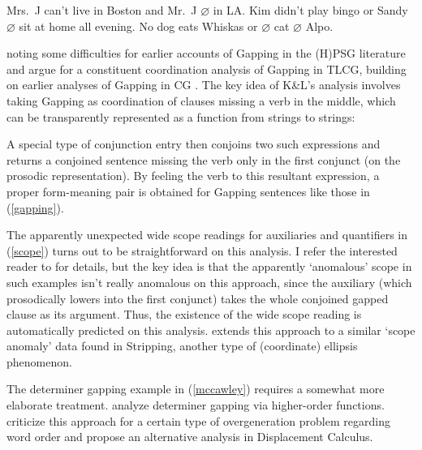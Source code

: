 \documentclass[output=paper]{langsci/langscibook}
\begin{document}
\begin{exe}
 \ex\label{scope}
  \begin{xlist}
 \ex\label{mrj1}
    Mrs.\ J can't live in Boston and Mr.\ J  \ensuremath{\varnothing}  in LA.
 \ex\label{ex2b}
    Kim didn't play bingo or Sandy  \ensuremath{\varnothing}  sit at home all evening.
 \ex\label{mccawley}
    No dog eats Whiskas or  \ensuremath{\varnothing}  cat  \ensuremath{\varnothing}  Alpo.
  \end{xlist}
\end{exe}

\citet{kubota-levine-nels,kubota-levine-gapping} noting some difficulties
for earlier accounts of Gapping in the (H)PSG literature and argue
for a constituent coordination analysis of Gapping in TLCG, building
on earlier analyses of Gapping in CG 
\citep{Steedman90a-u,hendriks95,morrillsolias93}. The key idea of
K\&L's analysis involves taking Gapping as coordination of clauses
missing a verb in the middle, which can be transparently represented
as a function from strings to strings:

\begin{exe}
 \ex\label{}
  \pt{ \ensuremath{\lambda} \ensuremath{\greekp}. leslie \ensuremath{\circ}\xspace \ensuremath{\greekp} \ensuremath{\circ}\xspace a \ensuremath{\circ}\xspace cd }
\end{exe}
A special type of conjunction entry then conjoins two such expressions
and returns a conjoined sentence missing the verb only in the first
conjunct (on the prosodic representation). By feeling the verb to
this resultant expression,  a proper form-meaning  pair is obtained
for Gapping sentences like those in (\ref{gapping}).

The apparently unexpected wide scope readings for auxiliaries and
quantifiers in (\ref{scope}) turns out to be straightforward on this
analysis. I refer the interested reader to \citet{kubota-levine-gapping} for
details, but the key idea is that the apparently `anomalous' scope in
such examples isn't really anomalous on this approach, since the
auxiliary (which prosodically lowers into the first conjunct) takes
the whole conjoined gapped clause as its argument. Thus, the existence
of the wide scope reading is automatically predicted on this analysis.
\citet{puthawala2018} extends this approach to a similar `scope anomaly'
data found in Stripping, another type of (coordinate) ellipsis
phenomenon.

The determiner gapping example in (\ref{mccawley}) requires a somewhat more
elaborate treatment. \citet{kubota-levine-gapping} analyze determiner
gapping via higher-order functions. \citet{morrillvalentin16} criticize this
approach for a certain type of overgeneration problem regarding word
order and propose an alternative analysis in Displacement Calculus.
\end{document}
